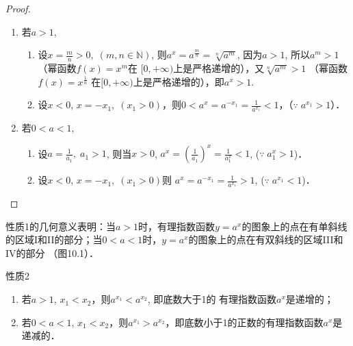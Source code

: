 \begin{proof}
\begin{enumerate}
\item 若$a>1$, 
\begin{enumerate}
  \item 设$x=\frac{m}{n}>0,\; (m,n\in\mathbb{N})$, 则$a^x=
a^{\tfrac{m}{n}}=\sqrt[n]{a^m}$, 因为$a>1$, 所以$a^m>1$ （幂函数$f(x)=x^m$在
$[0,+\infty)$上是严格递增的），又$\sqrt[n]{a^m}>1$ （幂函数$f(x)=x^{\tfrac{1}{n}}$
在$[0,+\infty)$上是严格递增的），即$a^x>1$.
\item 设$x<0$, 
$x=-x_1,\; (x_1>0)$，则$0<a^x=a^{-x_1}=\frac{1}{a^{x_1}}<1$，（$\because\; a^{x_1}>1$）．
\end{enumerate}
 
\item 若$0<a<1$, 
\begin{enumerate}
  \item 设$a=\frac{1}{a_1},\; a_1>1$, 则当$x>0$, $a^x=\left(\frac{1}{a_1}\right)^x=\frac{1}{a^x_1}<1$, ($\because\; a_1^{x}>1$)．
  \item 设$x<0$, $x=-x_1,\; (x_1>0)$则
$a^x=a^{-x_1}=\frac{1}{a^{x_1}}>1$, ($\because\; a^{x_1}<1$)．
\end{enumerate}
\end{enumerate}
\end{proof}

性质1的几何意义表明：当$a>1$时，有理指数函数$y=
a^x$的图象上的点在有单斜线的区域I和II的部分；当$0<a<
1$时，$y=a^x$的图象上的点在有双斜线的区域III和IV的部分
（图10.1）．

\begin{figure}[htp]
  \centering
{}
  \caption{}
\end{figure}

\begin{blk}{性质2}
\begin{enumerate}
  \item 若$a>1$, $x_1<x_2$，则$a^{x_1}<a^{x_2}$, 即底数大于1的
有理指数函数$a^x$是递增的；
\item 若$0<a<1$, $x_1<x_2$，则$a^{x_1}>a^{x_2}$，即底数小于1的正数的有理指数函数$a^x$是递减的．
\end{enumerate}
\end{blk}

